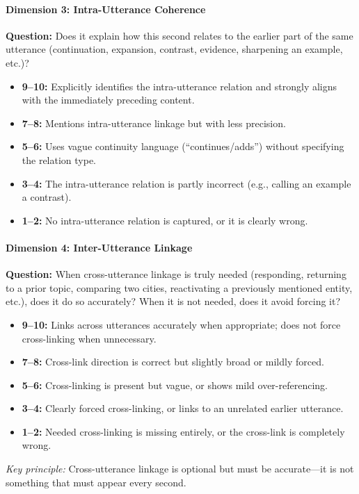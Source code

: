 \paragraph{Dimension 3: Intra-Utterance Coherence}
\textbf{Question:} Does it explain how this second relates to the earlier part of the same utterance (continuation, expansion, contrast, evidence, sharpening an example, etc.)?
\begin{itemize}
  \item \textbf{9--10:} Explicitly identifies the intra-utterance relation and strongly aligns with the immediately preceding content.
  \item \textbf{7--8:} Mentions intra-utterance linkage but with less precision.
  \item \textbf{5--6:} Uses vague continuity language (``continues/adds'') without specifying the relation type.
  \item \textbf{3--4:} The intra-utterance relation is partly incorrect (e.g., calling an example a contrast).
  \item \textbf{1--2:} No intra-utterance relation is captured, or it is clearly wrong.
\end{itemize}

\paragraph{Dimension 4: Inter-Utterance Linkage}
\textbf{Question:} When cross-utterance linkage is truly needed (responding, returning to a prior topic, comparing two cities, reactivating a previously mentioned entity, etc.), does it do so accurately? When it is not needed, does it avoid forcing it?
\begin{itemize}
  \item \textbf{9--10:} Links across utterances accurately when appropriate; does not force cross-linking when unnecessary.
  \item \textbf{7--8:} Cross-link direction is correct but slightly broad or mildly forced.
  \item \textbf{5--6:} Cross-linking is present but vague, or shows mild over-referencing.
  \item \textbf{3--4:} Clearly forced cross-linking, or links to an unrelated earlier utterance.
  \item \textbf{1--2:} Needed cross-linking is missing entirely, or the cross-link is completely wrong.
\end{itemize}
\noindent
\textit{Key principle:} Cross-utterance linkage is optional but must be accurate---it is not something that must appear every second.

